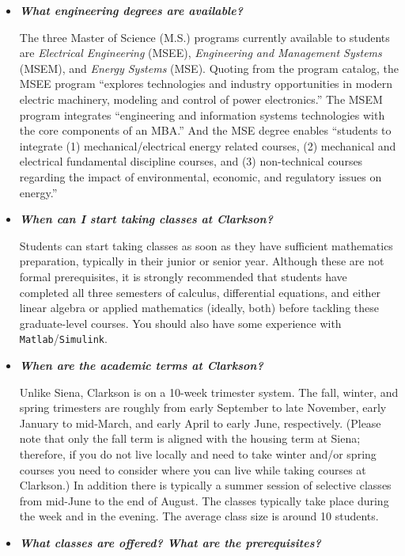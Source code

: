 \documentclass[12pt]{article}
\begin{document}
\begin{itemize}
\item{{\bf {\em What engineering degrees are available?}}

  The three Master of Science (M.S.) programs currently available to students
  are {\em Electrical Engineering} (MSEE), {\em Engineering and Management
    Systems} (MSEM), and {\em Energy Systems} (MSE).  Quoting from the program
  catalog, the MSEE program ``explores technologies and industry opportunities
  in modern electric machinery, modeling and control of power electronics.''
  The MSEM program integrates ``engineering and information systems technologies
  with the core components of an MBA.''  And the MSE degree enables ``students
  to integrate (1) mechanical/electrical energy related courses, (2) mechanical
  and electrical fundamental discipline courses, and (3) non-technical courses
  regarding the impact of environmental, economic, and regulatory issues on
  energy.''}

\item{{\bf {\em When can I start taking classes at Clarkson?}}

  Students can start taking classes as soon as they have sufficient mathematics
  preparation, typically in their junior or senior year.  Although these are not
  formal prerequisites, it is strongly recommended that students have completed
  all three semesters of calculus, differential equations, and either linear
  algebra or applied mathematics (ideally, both) before tackling these
  graduate-level courses.  You should also have some experience with {\tt
    Matlab}/{\tt Simulink}.}

\item{{\bf {\em When are the academic terms at Clarkson?}}

  Unlike Siena, Clarkson is on a 10-week trimester system.  The fall, winter,
  and spring trimesters are roughly from early September to late November, early
  January to mid-March, and early April to early June, respectively.  (Please
  note that only the fall term is aligned with the housing term at Siena;
  therefore, if you do not live locally and need to take winter and/or spring
  courses you need to consider where you can live while taking courses at
  Clarkson.)  In addition there is typically a summer session of selective
  classes from mid-June to the end of August.  The classes typically take place
  during the week and in the evening.  The average class size is around 10
  students.}

\item{{\bf {\em What classes are offered?  What are the prerequisites?}}

}
\end{itemize}
\end{document}
